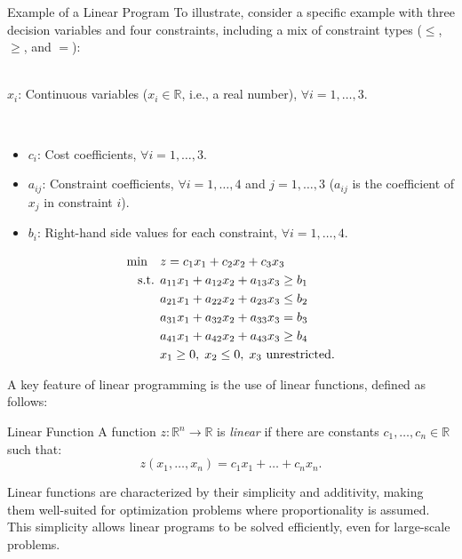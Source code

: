 \begin{example}{Example of a Linear Program}{}
To illustrate, consider a specific example with three decision variables and four constraints, including a mix of constraint types ($\leq$, $\geq$, and $=$):

\smallskip {}\\
$x_i$: Continuous variables ($x_i \in \mathbb{R}$, i.e., a real number), $\forall i = 1,\dots,3$.

\smallskip {}\\
\begin{itemize}
    \item $c_i$: Cost coefficients, $\forall i = 1,\dots,3$.
    \item $a_{ij}$: Constraint coefficients, $\forall i = 1,\dots,4$ and $j = 1,\dots,3$ ($a_{ij}$ is the coefficient of $x_j$ in constraint $i$).
    \item $b_i$: Right-hand side values for each constraint, $\forall i = 1,\dots,4$.
\end{itemize}

\smallskip {}
\begin{align*}
\min \quad & z = c_1x_1 + c_2x_2 + c_3x_3 \\
\text{ s.t. }        & a_{11}x_1 + a_{12}x_2 + a_{13}x_3 \geq b_1 \\
& a_{21}x_1 + a_{22}x_2 + a_{23}x_3 \leq b_2 \\
& a_{31}x_1 + a_{32}x_2 + a_{33}x_3 = b_3 \\
& a_{41}x_1 + a_{42}x_2 + a_{43}x_3 \geq b_4 \\
& x_1 \geq 0, \; x_2 \leq 0, \; x_3 \text{ unrestricted.}
\end{align*}
\end{example}

A key feature of linear programming is the use of linear functions, defined as follows:

\begin{definition}{Linear Function}\label{def:linearfunction}
A function $z: \mathbb{R}^n \rightarrow \mathbb{R}$ is \textit{linear} if there are constants $c_1, \dots, c_n \in \mathbb{R}$ such that:
\begin{equation}
z(x_1, \dots, x_n) = c_1x_1 + \dots + c_nx_n.
\end{equation}
\label{def:LinearFunc}
\end{definition}

Linear functions are characterized by their simplicity and additivity, making them well-suited for optimization problems where proportionality is assumed. This simplicity allows linear programs to be solved efficiently, even for large-scale problems.


